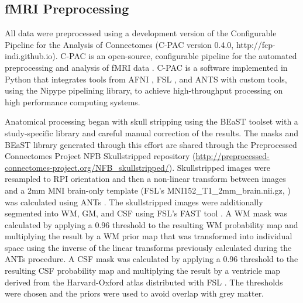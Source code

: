 \subsection{fMRI Preprocessing}

All data were preprocessed using a development version of the Configurable Pipeline for the Analysis of Connectomes (C-PAC version 0.4.0, http://fcp-indi.github.io). C-PAC is an open-source, configurable pipeline for the automated preprocessing and analysis of fMRI data \cite{Cameron_2013}. C-PAC is a software implemented in Python that integrates tools from AFNI \cite{Cox_1996}, FSL \cite{Smith_2004}, and ANTS \cite{Avants_2008} with custom tools, using the Nipype \cite{Gorgolewski_2011} pipelining library, to achieve high-throughput processing on high performance computing systems.

Anatomical processing began with skull stripping using the BEaST toolset \cite{Eskildsen_2012} with a study-specific library and careful manual correction of the results. The masks and BEaST library generated through this effort are shared through the Preprocessed Connectomes Project NFB Skullstripped repository (\href{http://preprocessed-connectomes-project.org/NFB_skullstripped/}{http://preprocessed-connectomes-project.org/NFB\_skullstripped/})\cite{Puccio_2016}. Skullstripped images were resampled to RPI orientation and then a non-linear transform between images and a 2mm MNI brain-only template (FSL's MNI152\_T1\_2mm_brain.nii.gz, \cite{Smith_2004}) was calculated using ANTs \cite{Avants_2008}. The skullstripped images were additionally segmented into WM, GM, and CSF using FSL's FAST tool \cite{Zhang_2001}. A WM mask was calculated by applying a 0.96 threshold to the resulting WM probability map and multiplying the result by a WM prior map that was transformed into individual space using the inverse of the linear transforms previously calculated during the ANTs procedure. A CSF mask was calculated by applying a 0.96 threshold to the resulting CSF probability map and multiplying the result by a ventricle map derived from the Harvard-Oxford atlas distributed with FSL \cite{Makris_2006}. The thresholds were chosen and the priors were used to avoid overlap with grey matter.

